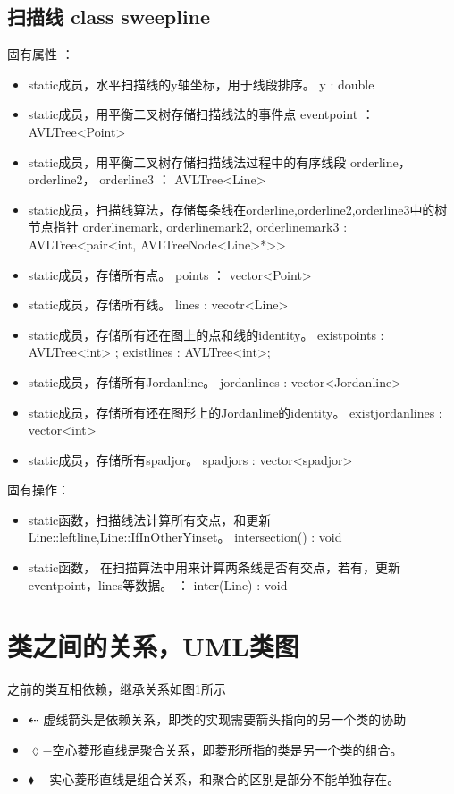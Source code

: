 \documentclass[a4paper]{book}
\numberwithin{equation}{chapter}
\theoremstyle{definition}
\begin{document}
\subsection{扫描线  class sweepline}
固有属性 ：
\begin{itemize}
	\item  static成员，水平扫描线的y轴坐标，用于线段排序。  y : double
	\item  static成员，用平衡二叉树存储扫描线法的事件点  eventpoint ： AVLTree<Point>
	\item  static成员，用平衡二叉树存储扫描线法过程中的有序线段  orderline， orderline2， orderline3  ： AVLTree<Line>
	\item  static成员，扫描线算法，存储每条线在orderline,orderline2,orderline3中的树节点指针  
	orderlinemark, orderlinemark2, orderlinemark3 : AVLTree<pair<int, AVLTreeNode<Line>*>> 
	\item  static成员，存储所有点。 points ： vector<Point>
	\item  static成员，存储所有线。 lines : vecotr<Line>
	\item  static成员，存储所有还在图上的点和线的identity。 existpoints : AVLTree<int> ; existlines : AVLTree<int>;
	\item  static成员，存储所有Jordanline。 jordanlines : vector<Jordanline>
	\item  static成员，存储所有还在图形上的Jordanline的identity。 existjordanlines : vector<int>
	\item  static成员，存储所有spadjor。  spadjors : vector<spadjor>
\end{itemize}
固有操作：
\begin{itemize}
	\item  static函数，扫描线法计算所有交点，和更新Line::leftline,Line::IfInOtherYinset。
	intersection() : void
	\item  static函数， 在扫描算法中用来计算两条线是否有交点，若有，更新eventpoint，lines等数据。 ： inter(Line) : void
\end{itemize}
%

\section{\heiti  类之间的关系，UML类图}
之前的类互相依赖，继承关系如图1所示
\begin{itemize}
	\item  \begin{math}
		\dashleftarrow
	\end{math} 虚线箭头是依赖关系，即类的实现需要箭头指向的另一个类的协助
	\item  \begin{math}
		\lozenge-
	\end{math}空心菱形直线是聚合关系，即菱形所指的类是另一个类的组合。
	\item  \begin{math}
		\blacklozenge-
	\end{math}实心菱形直线是组合关系，和聚合的区别是部分不能单独存在。
\end{itemize}
\end{document}

